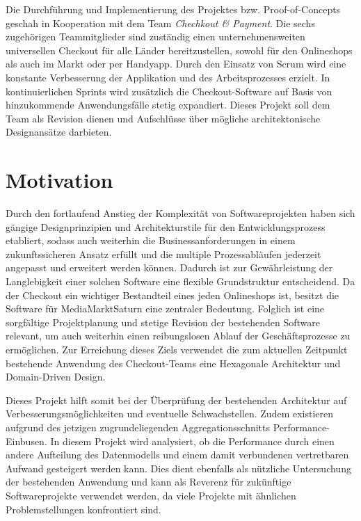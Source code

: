 Die Durchführung und Implementierung des Projektes bzw. Proof-of-Concepts geschah in Kooperation mit dem Team \emph{Chechkout \& Payment}. Die sechs zugehörigen Teammitglieder sind zuständig einen unternehmensweiten universellen Checkout für alle Länder bereitzustellen, sowohl für den Onlineshops als auch im Markt oder per Handyapp. Durch den Einsatz von \Gls{Scrum} wird eine konstante Verbesserung der Applikation und des Arbeitsprozesses erzielt. In kontinuierlichen \Glspl{Sprint} wird zusätzlich die Checkout-Software auf Basis von hinzukommende Anwendungsfälle stetig expandiert. Dieses Projekt soll dem Team als Revision dienen und Aufschlüsse über mögliche architektonische Designansätze darbieten.


\section{Motivation}


Durch den fortlaufend Anstieg der Komplexität von Softwareprojekten haben sich gängige Designprinzipien und Architekturstile für den Entwicklungsprozess etabliert, sodass auch weiterhin die Businessanforderungen in einem zukunftssicheren Ansatz erfüllt und die multiple Prozessabläufen jederzeit angepasst und erweitert werden können. Dadurch ist zur Gewährleistung der Langlebigkeit einer solchen Software eine flexible Grundstruktur entscheidend. Da der Checkout ein wichtiger Bestandteil eines jeden Onlineshops ist, besitzt die Software für MediaMarktSaturn eine zentraler Bedeutung. Folglich ist eine sorgfältige Projektplanung und stetige Revision der bestehenden Software relevant, um auch weiterhin einen reibungslosen Ablauf der Geschäftsprozesse zu ermöglichen. Zur Erreichung dieses Ziels verwendet die zum aktuellen Zeitpunkt bestehende Anwendung des Checkout-Teams eine Hexagonale Architektur und Domain-Driven Design.

Dieses Projekt hilft somit bei der Überprüfung der bestehenden Architektur auf Verbesserungsmöglichkeiten und eventuelle Schwachstellen. Zudem existieren aufgrund des jetzigen zugrundeliegenden Aggregationsschnitts Performance-Einbusen. In diesem Projekt wird analysiert, ob die Performance durch einen andere Aufteilung des Datenmodells und einem damit verbundenen vertretbaren Aufwand gesteigert werden kann. Dies dient ebenfalls als nützliche Untersuchung der bestehenden Anwendung und kann als Reverenz für zukünftige Softwareprojekte verwendet werden, da viele Projekte mit ähnlichen Problemstellungen konfrontiert sind.



